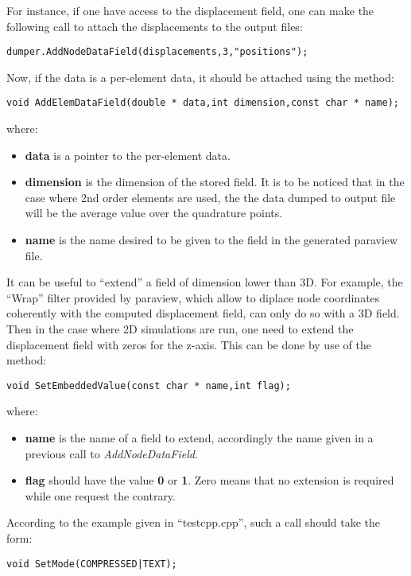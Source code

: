For instance, if one have access to the displacement field, one can make the following call to attach 
the displacements to the output files:
\begin{lstlisting}[frame=tb,backgroundcolor=\color{white}]
dumper.AddNodeDataField(displacements,3,"positions");
\end{lstlisting}

Now, if the data is a per-element data, it should be attached using the method:
\begin{lstlisting}[frame=tbrl]
void AddElemDataField(double * data,int dimension,const char * name);
\end{lstlisting}
where:
\begin{itemize}
\item {\bf data} is a pointer to the per-element data.
\item {\bf dimension} is the dimension of the stored field. It is to be noticed that in the case where 
2nd order elements are used, the the data dumped to output file will be the average value over the quadrature points.
\item {\bf name} is the name desired to be given to the field in the generated paraview file.\\
\end{itemize}

It can be useful to ``extend'' a field of dimension lower than 3D. For example, the ``Wrap'' filter provided 
by paraview, which allow to diplace node coordinates coherently with the computed displacement field, can only
do so with a 3D field. Then in the case where 2D simulations are run, one need to extend the displacement field
with zeros for the z-axis. This can be done by use of the method:

\begin{lstlisting}[frame=tbrl]
void SetEmbeddedValue(const char * name,int flag);
\end{lstlisting}

where:
\begin{itemize}
\item {\bf name} is the name of a field to extend, accordingly the name given in a previous call to {\it AddNodeDataField}.
\item {\bf flag} should have the value {\bf 0} or {\bf 1}. Zero means that no extension is required while one 
request the contrary.
\end{itemize}

According to the example given in ``testcpp.cpp'', such a call should take the form:
\begin{lstlisting}[frame=tb,backgroundcolor=\color{white}]
void SetMode(COMPRESSED|TEXT);
\end{lstlisting}

